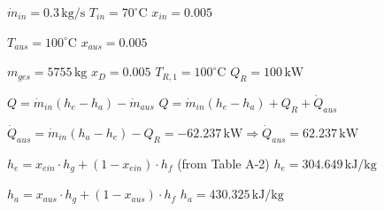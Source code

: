 \( \dot{m}_{in} = 0.3 \, \text{kg/s} \)  
\( T_{in} = 70^\circ \text{C} \)  
\( x_{in} = 0.005 \)  

\( T_{aus} = 100^\circ \text{C} \)  
\( x_{aus} = 0.005 \)  

\( m_{ges} = 5755 \, \text{kg} \)  
\( x_D = 0.005 \)  
\( T_{R,1} = 100^\circ \text{C} \)  
\( Q_R = 100 \, \text{kW} \)  

\( Q = \dot{m}_{in} (h_e - h_a) - \dot{m}_{aus} \)  
\( Q = \dot{m}_{in} (h_e - h_a) + Q_R + \dot{Q}_{aus} \)  

\( \dot{Q}_{aus} = \dot{m}_{in} (h_a - h_e) - Q_R = -62.237 \, \text{kW} \Rightarrow \dot{Q}_{aus} = 62.237 \, \text{kW} \)  

\( h_e = x_{ein} \cdot h_g + (1 - x_{ein}) \cdot h_f \) (from Table A-2)  
\( h_e = 304.649 \, \text{kJ/kg} \)  

\( h_a = x_{aus} \cdot h_g + (1 - x_{aus}) \cdot h_f \)  
\( h_a = 430.325 \, \text{kJ/kg} \)